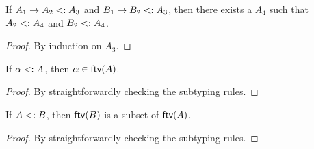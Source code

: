 \begin{lemma}
  \label{lemma:common-supertype}

  If $A_1 \to A_2 <: A_3$ and $B_1 \to B_2 <: A_3$,
  then there exists a $A_4$ such that $A_2 <: A_4$ and $B_2 <: A_4$.
\end{lemma}

\begin{proof}
  By induction on $A_3$. 
\end{proof}

\begin{lemma}
  \label{lemma:subtype-ftv-var}

  If $\alpha <: A$, then $\alpha \in \textsf{ftv}(A)$.
\end{lemma}

\begin{proof}
  By straightforwardly checking the subtyping rules.
\end{proof}

\begin{lemma}
  \label{lemma:subtype-ftv}

  If $A <: B$, then $\textsf{ftv}(B)$ is a subset of $\textsf{ftv}(A)$.
\end{lemma}

\begin{proof}
  By straightforwardly checking the subtyping rules.
\end{proof}

\algodissoundness*

